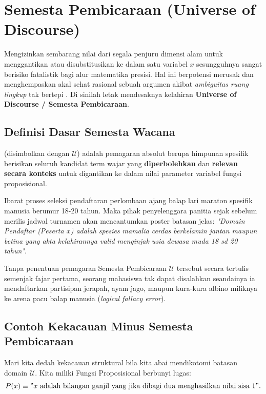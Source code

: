 \section{Semesta Pembicaraan (Universe of Discourse)}

Mengizinkan sembarang nilai dari segala penjuru dimensi alam untuk menggantikan atau disubstitusikan ke dalam satu variabel $x$ sesungguhnya sangat berisiko fatalistik bagi alur matematika presisi. Hal ini berpotensi merusak dan menghempaskan akal sehat rasional sebuah argumen akibat \textit{ambiguitas ruang lingkup} tak bertepi \cite{rosen2019}. Di sinilah letak mendesaknya kelahiran \textbf{Universe of Discourse / Semesta Pembicaraan}.

\subsection{Definisi Dasar Semesta Wacana}

\begin{definisi}
 (disimbolkan dengan $\mathcal{U}$) adalah pemagaran absolut berupa himpunan spesifik berisikan seluruh kandidat term wajar yang \textbf{diperbolehkan} dan \textbf{relevan secara konteks} untuk digantikan ke dalam nilai parameter variabel fungsi proposisional.
\end{definisi}

Ibarat proses seleksi pendaftaran perlombaan ajang balap lari maraton spesifik manusia berumur 18-20 tahun. Maka pihak penyelenggara panitia sejak sebelum merilis jadwal turnamen akan mencantumkan poster batasan jelas: \textit{"Domain Pendaftar (Peserta $x$) adalah spesies mamalia cerdas berkelamin jantan maupun betina yang akta kelahirannya valid menginjak usia dewasa muda 18 sd 20 tahun"}. 

Tanpa penentuan pemagaran Semesta Pembicaraan $\mathcal{U}$ tersebut secara tertulis semenjak fajar pertama, seorang mahasiswa tak dapat disalahkan seandainya ia mendaftarkan partisipan jerapah, ayam jago, maupun kura-kura albino miliknya ke arena pacu balap manusia (\textit{logical fallacy error}).

\subsection{Contoh Kekacauan Minus Semesta Pembicaraan}

Mari kita dedah kekacauan struktural bila kita abai mendikotomi batasan domain $\mathcal{U}$. Kita miliki Fungsi Proposisional berbunyi lugas: 
\[ P(x) \equiv \text{''}x \text{ adalah bilangan ganjil yang jika dibagi dua menghasilkan nilai sisa 1\text{''}}. \]

